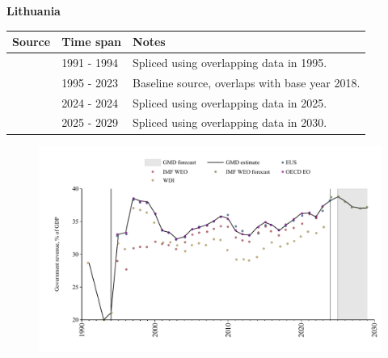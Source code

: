 \documentclass[12pt,a4paper,landscape]{article}
\begin{document}
\begin{adjustbox}{max totalsize={\paperwidth}{\paperheight},center}
\begin{minipage}[t][\textheight][t]{\textwidth}
\vspace*{0.5cm}
{}
\begin{center}
{\Large\bfseries Lithuania}
\end{center}
\vspace{0.5cm}
\begin{table}[H]
\centering
\small
\begin{tabular}{|l|l|l|}
\hline
\textbf{Source} & \textbf{Time span} & \textbf{Notes} \\
\hline
\rowcolor{white}\cite{WDI}& 1991 - 1994 &Spliced using overlapping data in 1995.\\
\rowcolor{lightgray}\cite{OECD_EO}& 1995 - 2023 &Baseline source, overlaps with base year 2018.\\
\rowcolor{white}\cite{EUS}& 2024 - 2024 &Spliced using overlapping data in 2025.\\
\rowcolor{lightgray}\cite{IMF_WEO_forecast}& 2025 - 2029 &Spliced using overlapping data in 2030.\\
\hline
\end{tabular}
\end{table}
\begin{figure}[H]
\centering
\includegraphics[width=\textwidth,height=0.6\textheight,keepaspectratio]{graphs/LTU_govrev_GDP.pdf}
\end{figure}
\end{minipage}
\end{adjustbox}
\end{document}
